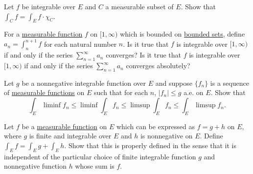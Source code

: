   \begin{exercise}[Royden 4.28]
    Let $f$ be integrable over $E$ and $C$ a measurable subset of $E$. Show that $\int_C f = \int_E f \cdot \chi_C$.
  \end{exercise}

  \begin{exercise}[Royden 4.29]
    For a \hyperref[def:measurable-function]{measurable function} $f$ on $[1, \infty)$ which is bounded on \hyperref[pst-def:bounded-set]{bounded sets}, define $a_n = \int_n^{n+1} f$ for each natural number $n$. Is it true that $f$ is integrable over $[1, \infty)$ if and only if the series $\sum_{n=1}^{\infty} a_n$ converges? Is it true that $f$ is integrable over $[1, \infty)$ if and only if the series $\sum_{n=1}^{\infty} a_n$ converges absolutely?
  \end{exercise}

  \begin{exercise}[Royden 4.30]
    Let $g$ be a nonnegative integrable function over $E$ and suppose $\{f_n\}$ is a sequence of \hyperref[def:measurable-function]{measurable functions} on $E$ such that for each $n$, $|f_n| \leq g$ a.e. on $E$. Show that
    \begin{equation*}
      \int_E \liminf f_n \leq \liminf \int_E f_n \leq \limsup \int_E f_n \leq \int_E \limsup f_n.
    \end{equation*}
  \end{exercise}

  \begin{exercise}[Royden 4.31]
    Let $f$ be a \hyperref[def:measurable-function]{measurable function} on $E$ which can be expressed as $f = g + h$ on $E$, where $g$ is finite and integrable over $E$ and $h$ is nonnegative on $E$. Define $\int_E f = \int_E g + \int_E h$. Show that this is properly defined in the sense that it is independent of the particular choice of finite integrable function $g$ and nonnegative function $h$ whose sum is $f$.
  \end{exercise}

